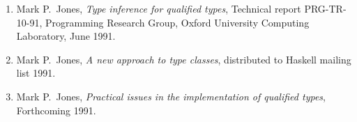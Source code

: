 \begin{enumerate}
\item
     Mark  P.~Jones,  
     {\em Type inference for  qualified  types},  
     Technical
     report PRG-TR-10-91, Programming Research Group, Oxford University
     Computing Laboratory, June 1991.

\item
     Mark  P.~Jones,  
     {\em A new approach to type classes},  
     distributed  to
     Haskell mailing list 1991.

\item
     Mark P.~Jones, 
     {\em Practical issues in the implementation of qualified types}, 
     Forthcoming 1991.
\end{enumerate}





